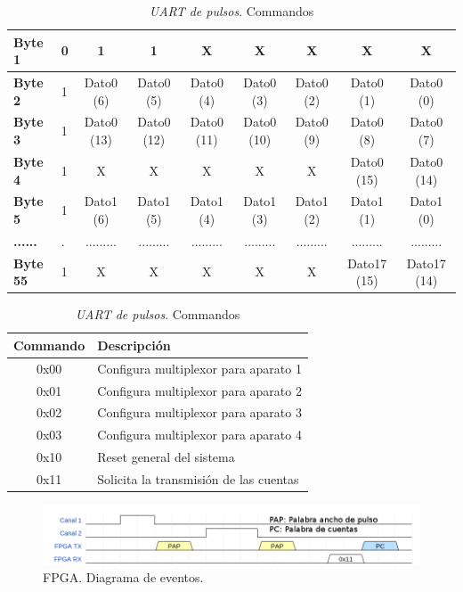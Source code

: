 \begin{table}[h]
\begin{tabularx}{\textwidth}{|l|X|c|c|c|c|c|c|c|}
				\cellcolor[HTML]{C0C0C0}\textbf{Byte 1}  & 0 & 1           & 1  	& X	      & X	    & X	  	 & X	       & X	     	\\ \hline
				\cellcolor[HTML]{C0C0C0}\textbf{Byte 2}  & 1 & Dato0 (6)   & Dato0 (5) 	& Dato0 (4)   & Dato0 (3)   & Dato0 (2)  & Dato0 (1)   & Dato0 (0)  	\\ \hline
				\cellcolor[HTML]{C0C0C0}\textbf{Byte 3}  & 1 & Dato0 (13)  & Dato0 (12)	& Dato0 (11)  & Dato0 (10)  & Dato0 (9)  & Dato0 (8)   & Dato0 (7)  	\\ \hline
				\cellcolor[HTML]{C0C0C0}\textbf{Byte 4}  & 1 & X	   & X	 	& X	      & X	    & X		 & Dato0 (15)  & Dato0 (14)	\\ \hline
				\cellcolor[HTML]{C0C0C0}\textbf{Byte 5}  & 1 & Dato1 (6)   & Dato1 (5) 	& Dato1 (4)   & Dato1 (3)   & Dato1 (2)  & Dato1 (1)   & Dato1 (0)  	\\ \hline
				\cellcolor[HTML]{C0C0C0}\textbf{......}  & . & .........   & ......... 	& .........   & .........   & .........  & .........   & .........  	\\ \hline
				\cellcolor[HTML]{C0C0C0}\textbf{Byte 55} & 1 & X	   & X	 	& X	      & X	    & X		 & Dato17 (15) & Dato17 (14)	\\ \hline
			\end{tabularx}
			\caption{\emph{UART de pulsos}. Palabra de cuentas}
			\label{tab:FPGAUartCont}
			\begin{tabularx}{\hsize}{|c|X|}
		  		\hline
				\rowcolor[HTML]{C0C0C0} 
		  		Commando & Descripción                            \\\hline
		  		0x00     & Configura multiplexor para aparato 1   \\\hline
		  		0x01     & Configura multiplexor para aparato 2   \\\hline
		  		0x02     & Configura multiplexor para aparato 3   \\\hline
		  		0x03     & Configura multiplexor para aparato 4   \\\hline
		  		0x10     & Reset general del sistema              \\\hline
		  		0x11     & Solicita la transmisión de las cuentas \\\hline
			\end{tabularx}
			\caption{\emph{UART de pulsos}. Commandos}
			\label{tab:FPGAUartComm}
		\end{table}
		\begin{figure}[h]
			\centering
			\includegraphics[keepaspectratio, width=1\textwidth]{./img/fpgawave.png}
			\caption{FPGA. Diagrama de eventos.}
			\label{fig:fpgaWave}
		\end{figure}
